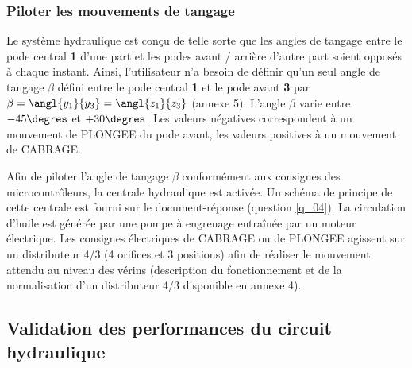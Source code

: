 \ifprof
\begin{corrige}
\end{corrige}
\else
\fi


\subsubsection{Piloter les mouvements de tangage}
\ifprof
\else

Le système hydraulique est conçu de telle sorte que les angles de tangage entre le pode central \textbf{1} d’une part et les
podes avant / arrière d’autre part soient opposés à chaque instant. Ainsi, l’utilisateur n’a besoin de définir qu’un seul
angle de tangage $\beta$ défini entre le pode central \textbf{1} et le pode avant \textbf{3} par $\beta=\angl{y_1}{y_3}=\angl{z_1}{z_3}$ (annexe 5). L’angle
$\beta$
varie entre $- 45\degres$ et $+30\degres$. Les valeurs négatives correspondent à un mouvement de PLONGEE du pode avant, les
valeurs positives à un mouvement de CABRAGE.

Afin de piloter l’angle de tangage $\beta$ conformément aux consignes des microcontrôleurs, la centrale hydraulique est activée. Un schéma de principe de cette centrale est fourni sur le document-réponse (question \ref{q_04}). La circulation d’huile est générée par une pompe à engrenage entraînée par un moteur électrique. Les consignes électriques de CABRAGE ou de PLONGEE agissent sur un distributeur 4/3 (4 orifices et 3 positions) afin de réaliser le mouvement attendu au niveau des vérins (description du fonctionnement et de la normalisation d’un distributeur 4/3 disponible en annexe 4).
\fi

\ifprof
\begin{corrige}
\end{corrige}
\else
\fi



\subsection{Validation des performances du circuit hydraulique}
\ifprof
\else

